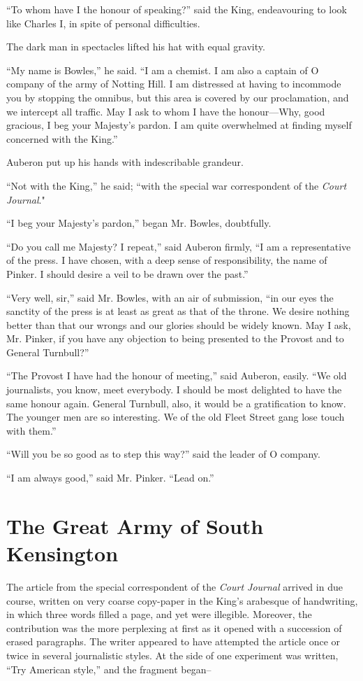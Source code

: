 \documentclass{book}
\begin{document}
“To whom have I the honour of speaking?” said the King, endeavouring to look like Charles I, in spite of personal difficulties.

The dark man in spectacles lifted his hat with equal gravity.

“My name is Bowles,” he said. “I am a chemist. I am also a captain of O company of the army of Notting Hill. I am distressed at having to incommode you by stopping the omnibus, but this area is covered by our proclamation, and we intercept all traffic. May I ask to whom I have the honour—Why, good gracious, I beg your Majesty’s pardon. I am quite overwhelmed at finding myself concerned with the King.”

Auberon put up his hands with indescribable grandeur.

“Not with the King,” he said; “with the special war correspondent of the \emph{Court Journal}."

“I beg your Majesty’s pardon,” began Mr. Bowles, doubtfully.

“Do you call me Majesty? I repeat,” said Auberon firmly, “I am a representative of the press. I have chosen, with a deep sense of responsibility, the name of Pinker. I should desire a veil to be drawn over the past.”

“Very well, sir,” said Mr. Bowles, with an air of submission, “in our eyes the sanctity of the press is at least as great as that of the throne. We desire nothing better than that our wrongs and our glories should be widely known. May I ask, Mr. Pinker, if you have any objection to being presented to the Provost and to General Turnbull?”

“The Provost I have had the honour of meeting,” said Auberon, easily. “We old journalists, you know, meet everybody. I should be most delighted to have the same honour again. General Turnbull, also, it would be a gratification to know. The younger men are so interesting. We of the old Fleet Street gang lose touch with them.”

“Will you be so good as to step this way?” said the leader of O company.

“I am always good,” said Mr. Pinker. “Lead on.”

\chapter{The Great Army of South Kensington}
\label{chapter-15}
The article from the special correspondent of the \emph{Court Journal} arrived in due course, written on very coarse copy-paper in the King’s arabesque of handwriting, in which three words filled a page, and yet were illegible. Moreover, the contribution was the more perplexing at first as it opened with a succession of erased paragraphs. The writer appeared to have attempted the article once or twice in several journalistic styles. At the side of one experiment was written, “Try American style,” and the fragment began–
\end{document}
